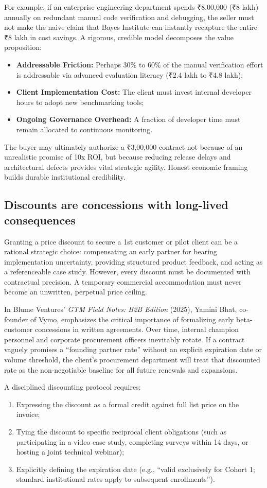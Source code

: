 For example, if an enterprise engineering department spends ₹8,00,000 (₹8 lakh) annually on redundant manual code verification and debugging, the seller must not make the naive claim that Bayes Institute can instantly recapture the entire ₹8 lakh in cost savings. A rigorous, credible model decomposes the value proposition:
\begin{itemize}
\item \textbf{Addressable Friction:} Perhaps 30\% to 60\% of the manual verification effort is addressable via advanced evaluation literacy (₹2.4 lakh to ₹4.8 lakh);
\item \textbf{Client Implementation Cost:} The client must invest internal developer hours to adopt new benchmarking tools;
\item \textbf{Ongoing Governance Overhead:} A fraction of developer time must remain allocated to continuous monitoring.
\end{itemize}
The buyer may ultimately authorize a ₹3,00,000 contract not because of an unrealistic promise of 10x ROI, but because reducing release delays and architectural defects provides vital strategic agility. Honest economic framing builds durable institutional credibility.

\subsection{Discounts are concessions with long-lived consequences}

Granting a price discount to secure a 1st customer or pilot client can be a rational strategic choice: compensating an early partner for bearing implementation uncertainty, providing structured product feedback, and acting as a referenceable case study. However, every discount must be documented with contractual precision. A temporary commercial accommodation must never become an unwritten, perpetual price ceiling.

In Blume Ventures' \textit{GTM Field Notes: B2B Edition} (2025), Yamini Bhat, co-founder of Vymo, emphasizes the critical importance of formalizing early beta-customer concessions in written agreements. Over time, internal champion personnel and corporate procurement officers inevitably rotate. If a contract vaguely promises a ``founding partner rate'' without an explicit expiration date or volume threshold, the client's procurement department will treat that discounted rate as the non-negotiable baseline for all future renewals and expansions.

A disciplined discounting protocol requires:
\begin{enumerate}
\item Expressing the discount as a formal credit against full list price on the invoice;
\item Tying the discount to specific reciprocal client obligations (such as participating in a video case study, completing surveys within 14 days, or hosting a joint technical webinar);
\item Explicitly defining the expiration date (e.g., ``valid exclusively for Cohort 1; standard institutional rates apply to subsequent enrollments'').
\end{enumerate}

